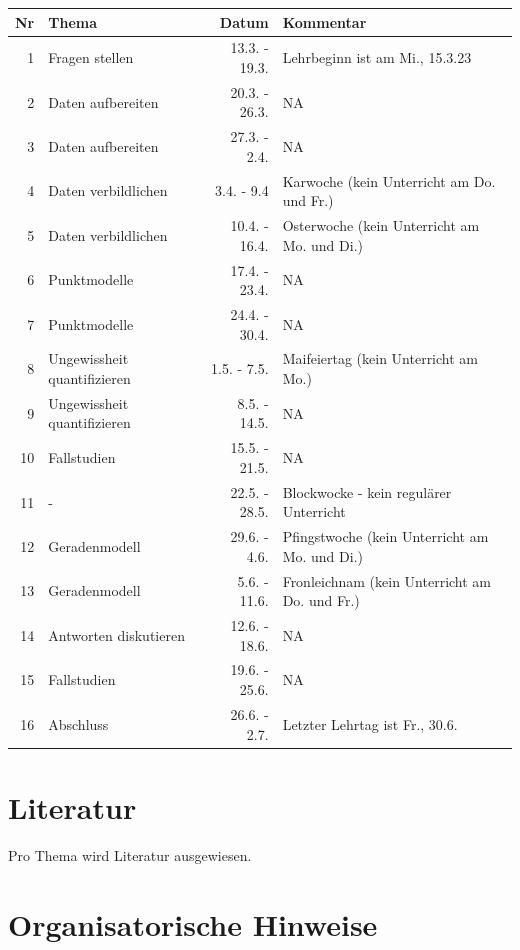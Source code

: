 \documentclass[
  a4paper,
  DIV=11]{scrreprt}
\theoremstyle{definition}
\theoremstyle{definition}
\theoremstyle{remark}
\begin{document}
\begin{longtable}{rlrl}
\toprule
Nr & Thema & Datum & Kommentar \\ 
\midrule
1 & Fragen stellen & 13.3. - 19.3. & Lehrbeginn ist am Mi., 15.3.23 \\ 
2 & Daten aufbereiten & 20.3. - 26.3. & NA \\ 
3 & Daten aufbereiten & 27.3. - 2.4. & NA \\ 
4 & Daten verbildlichen & 3.4. - 9.4 & Karwoche (kein Unterricht am Do. und Fr.) \\ 
5 & Daten verbildlichen & 10.4. - 16.4. & Osterwoche (kein Unterricht am Mo. und Di.) \\ 
6 & Punktmodelle & 17.4. - 23.4. & NA \\ 
7 & Punktmodelle & 24.4. - 30.4. & NA \\ 
8 & Ungewissheit quantifizieren & 1.5. - 7.5. & Maifeiertag (kein Unterricht am Mo.) \\ 
9 & Ungewissheit quantifizieren & 8.5. - 14.5. & NA \\ 
10 & Fallstudien & 15.5. - 21.5. & NA \\ 
11 & - & 22.5. - 28.5. & Blockwocke - kein regulärer Unterricht \\ 
12 & Geradenmodell & 29.6. - 4.6. & Pfingstwoche (kein Unterricht am Mo. und Di.) \\ 
13 & Geradenmodell & 5.6. - 11.6. & Fronleichnam (kein Unterricht am Do. und Fr.) \\ 
14 & Antworten diskutieren & 12.6. - 18.6. & NA \\ 
15 & Fallstudien & 19.6. - 25.6. & NA \\ 
16 & Abschluss & 26.6. - 2.7. & Letzter Lehrtag ist Fr., 30.6. \\ 
\bottomrule
\end{longtable}

\hypertarget{literatur}{%
\section*{Literatur}\label{literatur}}


Pro Thema wird Literatur ausgewiesen.

\hypertarget{organisatorische-hinweise}{%
\section*{Organisatorische Hinweise}\label{organisatorische-hinweise}}
\end{document}
